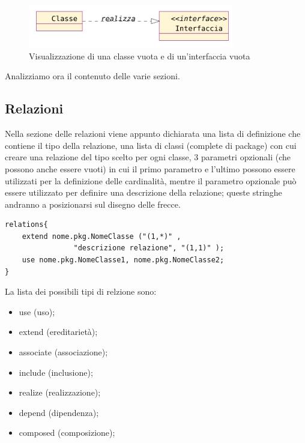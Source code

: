 \begin{figure}[htp]
\begin{center}
  \includegraphics[width=0.8\textwidth]{img/class_interface}
  \caption[labelInTOC]{Visualizzazione di una classe vuota e di
  un'interfaccia vuota}
\end{center}
\end{figure}


Analizziamo ora il contenuto delle varie sezioni.

\subsection{Relazioni}

Nella sezione delle relazioni
viene appunto dichiarata una lista di definizione che contiene il tipo della 
relazione, una lista di classi (complete di package) 
con cui creare una relazione del tipo scelto
per ogni classe, 3 parametri opzionali (che possono anche essere vuoti) in cui
il primo parametro e l'ultimo possono essere utilizzati per la definizione delle
cardinalità, mentre il parametro opzionale può essere utilizzato per definire
una descrizione della relazione; queste stringhe andranno a posizionarsi sul 
disegno delle frecce.

\begin{lstlisting}[caption={Dichiarazione di relazione}, style={model}]
relations{
	extend nome.pkg.NomeClasse ("(1,*)" , 
				"descrizione relazione", "(1,1)" );
	use nome.pkg.NomeClasse1, nome.pkg.NomeClasse2;
}
\end{lstlisting}

La lista dei possibili tipi di relzione sono:
\begin{itemize}
  \item{use (uso);}
  \item{extend (ereditarietà);}
  \item{associate (associazione);}
  \item{include (inclusione);}
  \item{realize (realizzazione);}
  \item{depend (dipendenza);}
  \item{composed (composizione);}
\end{itemize}

